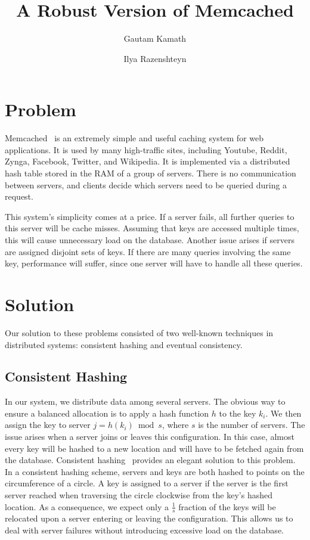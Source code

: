\documentclass[letterpaper,11pt]{article}
\begin{document}
    \title{A Robust Version of Memcached}
    \author{Gautam Kamath \and Ilya Razenshteyn}
    \maketitle

    \section{Problem}
     Memcached~\cite{memcached} is an extremely simple and useful caching system for web applications.
     It is used by many high-traffic sites, including Youtube, Reddit, Zynga, Facebook, Twitter, and Wikipedia.
     It is implemented via a distributed hash table stored in the RAM of a group of servers.
     There is no communication between servers, and clients decide which servers need to be queried during a request.

     This system's simplicity comes at a price.
     If a server fails, all further queries to this server will be cache misses.
     Assuming that keys are accessed multiple times, this will cause unnecessary load on the database.
     Another issue arises if servers are assigned disjoint sets of keys.
     If there are many queries involving the same key, performance will suffer, since one server will have to handle all these queries.
     \section{Solution}
     Our solution to these problems consisted of two well-known techniques in distributed systems: consistent hashing and eventual consistency.
     \subsection{Consistent Hashing}
     In our system, we distribute data among several servers.
     The obvious way to ensure a balanced allocation is to apply a hash function $h$ to the key $k_i$.
     We then assign the key to server $j = h(k_i) \bmod s$, where $s$ is the number of servers.
     The issue arises when a server joins or leaves this configuration.
     In this case, almost every key will be hashed to a new location and will have to be fetched again from the database.
     Consistent hashing~\cite{chashing} provides an elegant solution to this problem.
     In a consistent hashing scheme, servers and keys are both hashed to points on the circumference of a circle.
     A key is assigned to a server if the server is the first server reached when traversing the circle clockwise from the key's hashed location.
     As a consequence, we expect only a $\frac{1}{s}$ fraction of the keys will be relocated upon a server entering or leaving the configuration.
     This allows us to deal with server failures without introducing excessive load on the database.
\end{document}
